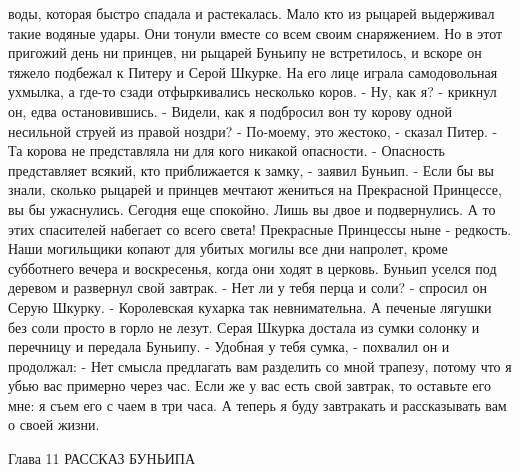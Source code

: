 воды, которая быстро спадала и растекалась. Мало кто из рыцарей 
выдерживал такие водяные удары. Они тонули вместе со всем своим 
снаряжением.
    Но в этот пригожий день ни принцев, ни рыцарей Буньипу не 
встретилось, и вскоре он тяжело подбежал к Питеру и Серой Шкурке. На 
его лице играла самодовольная ухмылка, а где-то сзади отфыркивались 
несколько коров.
    - Ну, как я? - крикнул он, едва остановившись. - Видели, как я 
подбросил вон ту корову одной несильной струей из правой ноздри?
    - По-моему, это жестоко, - сказал Питер. - Та корова не 
представляла ни для кого никакой опасности.
    - Опасность представляет всякий, кто приближается к замку, - 
заявил Буньип. - Если бы вы знали, сколько рыцарей и принцев мечтают 
жениться на Прекрасной Принцессе, вы бы ужаснулись. Сегодня еще 
спокойно. Лишь вы двое и подвернулись. А то этих спасителей набегает 
со всего света! Прекрасные Принцессы ныне - редкость. Наши могильщики 
копают для убитых могилы все дни напролет, кроме субботнего вечера и 
воскресенья, когда они ходят в церковь.
    Буньип уселся под деревом и развернул свой завтрак.
    - Нет ли у тебя перца и соли? - спросил он Серую Шкурку. - 
Королевская кухарка так невнимательна. А печеные лягушки без соли 
просто в горло не лезут.
    Серая Шкурка достала из сумки солонку и перечницу и передала 
Буньипу.
    - Удобная у тебя сумка, - похвалил он и продолжал: - Нет смысла 
предлагать вам разделить со мной трапезу, потому что я убью вас 
примерно через час. Если же у вас есть свой завтрак, то оставьте его 
мне: я съем его с чаем в три часа. А теперь я буду завтракать и 
рассказывать вам о своей жизни.

        Глава 11
        РАССКАЗ БУНЬИПА


